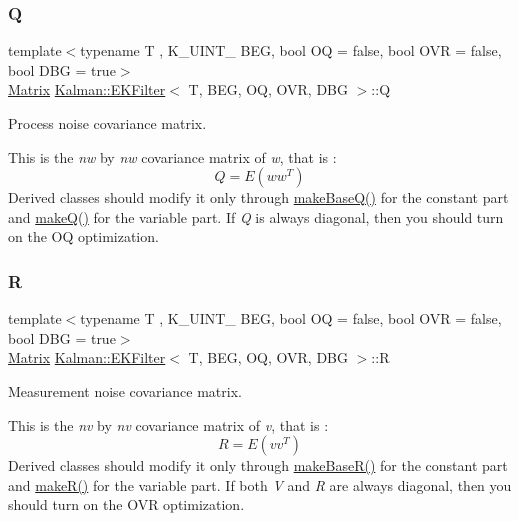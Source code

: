 \subsubsection{\texorpdfstring{Q}{Q}}
{\footnotesize\ttfamily template$<$typename T , K\+\_\+\+U\+I\+N\+T\+\_ B\+EG, bool OQ = false, bool O\+VR = false, bool D\+BG = true$>$ \\
\mbox{\hyperlink{classKalman_1_1EKFilter_a7cbc4cb4d9139a7f241b27110426af43}{Matrix}} \mbox{\hyperlink{classKalman_1_1EKFilter}{Kalman\+::\+E\+K\+Filter}}$<$ T, B\+EG, OQ, O\+VR, D\+BG $>$\+::Q\hspace{0.3cm}{\ttfamily [protected]}}



Process noise covariance matrix. 

This is the {\itshape nw} by {\itshape nw} covariance matrix of {\itshape w}, that is \+: \[ Q = E\left( w w^T \right) \] Derived classes should modify it only through {\ttfamily \mbox{\hyperlink{classKalman_1_1EKFilter_af996b71b5762e8284226a96c6aac8d87}{make\+Base\+Q()}}} for the constant part and {\ttfamily \mbox{\hyperlink{classKalman_1_1EKFilter_ab9765c4cbe0f67a1aa82ddfbc8173877}{make\+Q()}}} for the variable part. If {\itshape Q} is always diagonal, then you should turn on the {\ttfamily OQ} optimization. \mbox{\label{classKalman_1_1EKFilter_ae869345d1d3bb288d87b849556cf7c4f}} 
\subsubsection{\texorpdfstring{R}{R}}
{\footnotesize\ttfamily template$<$typename T , K\+\_\+\+U\+I\+N\+T\+\_ B\+EG, bool OQ = false, bool O\+VR = false, bool D\+BG = true$>$ \\
\mbox{\hyperlink{classKalman_1_1EKFilter_a7cbc4cb4d9139a7f241b27110426af43}{Matrix}} \mbox{\hyperlink{classKalman_1_1EKFilter}{Kalman\+::\+E\+K\+Filter}}$<$ T, B\+EG, OQ, O\+VR, D\+BG $>$\+::R\hspace{0.3cm}{\ttfamily [protected]}}



Measurement noise covariance matrix. 

This is the {\itshape nv} by {\itshape nv} covariance matrix of {\itshape v}, that is \+: \[ R = E\left( v v^T \right) \] Derived classes should modify it only through {\ttfamily \mbox{\hyperlink{classKalman_1_1EKFilter_adaa2b05e931d64bf8f762812e06ce369}{make\+Base\+R()}}} for the constant part and {\ttfamily \mbox{\hyperlink{classKalman_1_1EKFilter_aff7a7f2d08673db1330e04e349b3bb8b}{make\+R()}}} for the variable part. If both {\itshape V} and {\itshape R} are always diagonal, then you should turn on the {\ttfamily O\+VR} optimization. \mbox{\label{classKalman_1_1EKFilter_ad4403db2f52f9a47cd9f432fc44e0a5d}} 
